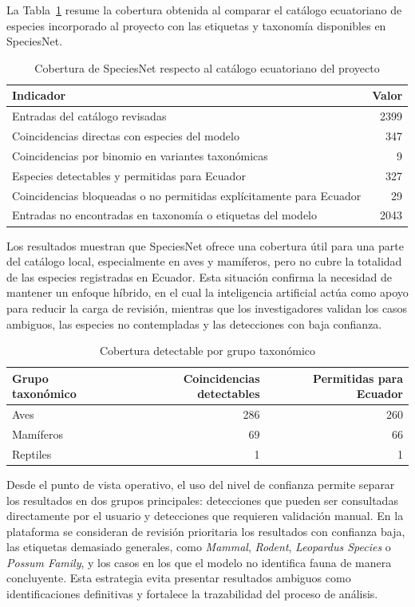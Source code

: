 La Tabla~\ref{tab:cobertura_speciesnet_ecuador} resume la cobertura obtenida al comparar el catálogo ecuatoriano de especies incorporado al proyecto con las etiquetas y taxonomía disponibles en SpeciesNet.

\begin{table}[H]
\centering
\caption{Cobertura de SpeciesNet respecto al catálogo ecuatoriano del proyecto}
\label{tab:cobertura_speciesnet_ecuador}
\begin{tabular}{lr}
\toprule
\textbf{Indicador} & \textbf{Valor} \\
\midrule
Entradas del catálogo revisadas & 2399 \\
Coincidencias directas con especies del modelo & 347 \\
Coincidencias por binomio en variantes taxonómicas & 9 \\
Especies detectables y permitidas para Ecuador & 327 \\
Coincidencias bloqueadas o no permitidas explícitamente para Ecuador & 29 \\
Entradas no encontradas en taxonomía o etiquetas del modelo & 2043 \\
\bottomrule
\end{tabular}
\end{table}

Los resultados muestran que SpeciesNet ofrece una cobertura útil para una parte del catálogo local, especialmente en aves y mamíferos, pero no cubre la totalidad de las especies registradas en Ecuador. Esta situación confirma la necesidad de mantener un enfoque híbrido, en el cual la inteligencia artificial actúa como apoyo para reducir la carga de revisión, mientras que los investigadores validan los casos ambiguos, las especies no contempladas y las detecciones con baja confianza.

\begin{table}[H]
\centering
\caption{Cobertura detectable por grupo taxonómico}
\label{tab:cobertura_por_grupo}
\begin{tabular}{lrr}
\toprule
\textbf{Grupo taxonómico} & \textbf{Coincidencias detectables} & \textbf{Permitidas para Ecuador} \\
\midrule
Aves & 286 & 260 \\
Mamíferos & 69 & 66 \\
Reptiles & 1 & 1 \\
\bottomrule
\end{tabular}
\end{table}

Desde el punto de vista operativo, el uso del nivel de confianza permite separar los resultados en dos grupos principales: detecciones que pueden ser consultadas directamente por el usuario y detecciones que requieren validación manual. En la plataforma se consideran de revisión prioritaria los resultados con confianza baja, las etiquetas demasiado generales, como \textit{Mammal}, \textit{Rodent}, \textit{Leopardus Species} o \textit{Possum Family}, y los casos en los que el modelo no identifica fauna de manera concluyente. Esta estrategia evita presentar resultados ambiguos como identificaciones definitivas y fortalece la trazabilidad del proceso de análisis.

